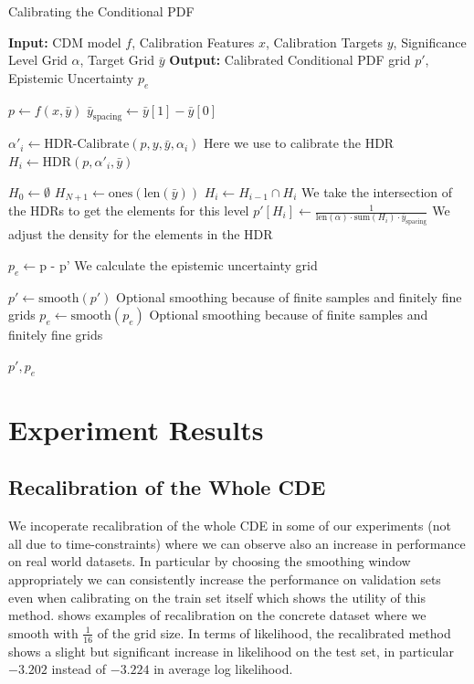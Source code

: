 \begin{algorithm}
    \caption{Calibrating the Conditional PDF}
    \label{alg:calibrate_pdf}
    \begin{algorithmic}
        \STATE \textbf{Input:} CDM model $f$, Calibration Features $x$, Calibration Targets $y$, Significance Level Grid $\alpha$, Target Grid $\bar{y}$
        \STATE \textbf{Output:} Calibrated Conditional PDF grid $p'$, Epistemic Uncertainty $p_e$

        \STATE $p \leftarrow f(x, \bar{y})$
        \STATE $\bar{y}_{\text{spacing}} \leftarrow \bar{y}[1] - \bar{y}[0]$

        \STATE $\alpha'_i \leftarrow \text{HDR-Calibrate}(p, y, \bar{y}, \alpha_i)$ Here we use  to calibrate the HDR
        \STATE $H_i \leftarrow \text{HDR}(p, \alpha'_i, \bar{y})$
        \ENDFOR

        \STATE $H_0 \leftarrow \emptyset$
        \STATE $H_{N+1} \leftarrow \text{ones}(\text{len}(\bar{y}))$
        \STATE $H_i \leftarrow H_{i - 1} \cap H_i$ We take the intersection of the HDRs to get the elements for this level
        \STATE $p'[H_i] \leftarrow \frac{1}{\text{len}(\alpha) \cdot \text{sum}(H_i) \cdot \bar{y}_{\text{spacing}}}$ We adjust the density for the elements in the HDR
        \ENDFOR

        \STATE $p_e \leftarrow \text{p - p'}$ We calculate the epistemic uncertainty grid

        \STATE $p' \leftarrow \text{smooth}(p')$ Optional smoothing because of finite samples and finitely fine grids
        \STATE $p_e \leftarrow \text{smooth}(p_e)$ Optional smoothing because of finite samples and finitely fine grids

        \RETURN $p', p_e$
    \end{algorithmic}
\end{algorithm}

\section{Experiment Results} \label{sec:results}

\subsection{Recalibration of the Whole CDE}

We incoperate recalibration of the whole CDE in some of our experiments (not all due to time-constraints) where we can observe also an increase in performance on real world datasets. In particular by choosing the smoothing window appropriately we can consistently increase the performance on validation sets even when calibrating on the train set itself which shows the utility of this method.  shows examples of recalibration on the concrete dataset where we smooth with $\frac{1}{16}$ of the grid size. In terms of likelihood, the recalibrated method shows a slight but significant increase in likelihood on the test set, in particular $-3.202$ instead of $-3.224$ in average log likelihood. %

